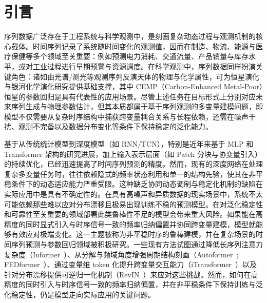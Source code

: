 \section{引言}
\label{sec:introduction}


序列数据广泛存在于工程系统与科学观测中，是刻画复杂动态过程与观测机制的核心载体。时间序列记录了系统随时间变化的观测值，因而在制造、物流、能源与医疗保健等多个领域至关重要：例如预测电力消耗、交通流量、产品销量与库存水平，或对工业过程进行早期预警与资源调度。在科学观测中，序列数据同样扮演关键角色：诸如由光谱/测光等观测序列反演天体的物理与化学属性，可为恒星演化与银河化学演化研究提供基础支撑，其中 CEMP（Carbon-Enhanced Metal-Poor）恒星的参数回归是具有代表性的应用场景。尽管上述任务在目标形式上分别对应未来序列生成与物理参数估计，但其本质都属于基于序列观测的多变量建模问题，即模型不仅需要从复杂时序结构中捕获跨变量耦合关系与长程依赖，还需在噪声干扰、观测不完备以及数据分布变化等条件下保持稳定的泛化能力。

基于从传统统计模型到深度模型（如 RNN/TCN），特别是近年来基于 MLP 和 Transformer 架构的研究进展，加上输入表示层面（如 Patch 分块与协变量引入）的持续优化，已经迅速提高了时间序列预测的精度。然而，现有的深度网络在处理复杂多变量任务时，往往依赖隐式的频率状态利用和单一的结构先验，使其在非平稳条件下的动态适应能力严重受限。这种缺乏协同动态调制与稳定化机制的缺陷在实际应用中是具有不确定性的。在具有高噪声和异质数据的现实场景中，系统不太可能依赖那些难以应对分布漂移且极易出现训练不稳的预测模型。在对泛化稳定性和可靠性至关重要的领域部署此类鲁棒性不足的模型会带来重大风险。如果能在高精度的同时显式引入与时序信号一致的频率归纳偏置并协同跨变量建模，模型就能够有效应对极端变化。这一主题被称为非平稳时序的鲁棒建模，并在复杂场景的时间序列预测与参数回归领域被积极研究。一些现有方法试图通过降低长序列注意力复杂度（Informer~\cite{informer}）、从分解与频域角度增强周期结构刻画（Autoformer~\cite{autoformer}; FEDformer~\cite{fedformer}）、通过变量维 token 化提升跨变量交互能力（iTransformer~\cite{itransformer}）以及针对分布漂移提供可逆归一化机制（RevIN~\cite{revin}）来应对这些挑战。然而，如何在高精度的同时引入与时序信号一致的频率归纳偏置，并在非平稳条件下保持训练与泛化稳定性，仍是模型走向实际应用的关键问题。

